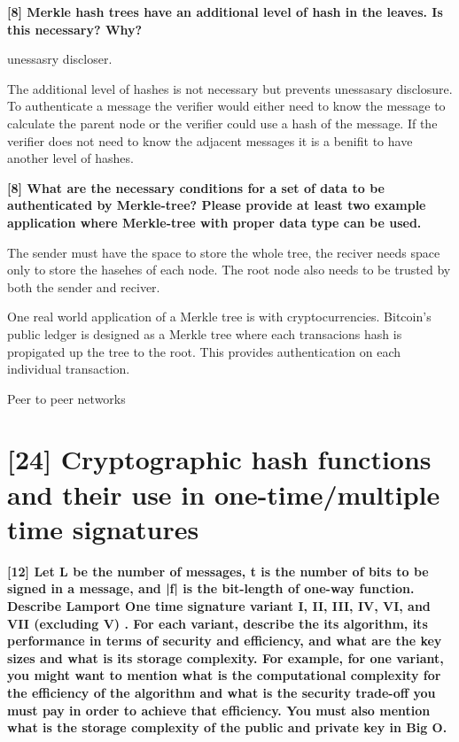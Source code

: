 \documentclass[letterpaper,11pt,notitlepage,fleqn]{article}
\begin{document}
\noindent \textbf{[8] Merkle hash trees have an additional level of hash in the leaves. Is this necessary? Why?}

unessasry discloser.

The additional level of hashes is not necessary but prevents unessasary disclosure. To authenticate a message the verifier would either need to know the message to calculate the parent node or the verifier could use a hash of the message. If the verifier does not need to know the adjacent messages it is a benifit to have another level of hashes. 

\noindent \textbf{[8] What are the necessary conditions for a set of data to be authenticated by Merkle-tree? Please provide at least two example application where Merkle-tree with proper data type can be used.}

The sender must have the space to store the whole tree, the reciver needs space only to store the hasehes of each node. The root node also needs to be trusted by both the sender and reciver. 

One real world application of a Merkle tree is with cryptocurrencies. Bitcoin's public ledger is designed as a Merkle tree where each transacions hash is propigated up the tree to the root. This provides authentication on each individual transaction.

Peer to peer networks


\section{[24] Cryptographic hash functions and their use in one-time/multiple time signatures}

\noindent \textbf{[12] Let L be the number of messages, t is the number of bits to be signed in a message, and |f| is the bit-length of one-way function. Describe Lamport One time signature variant I, II, III, IV, VI, and VII (excluding V) . For each variant, describe the its algorithm, its performance in terms of security and efficiency,  and what are the key sizes and what is its storage complexity. For example, for one variant, you might want to mention what is the computational complexity for the
efficiency  of the algorithm and what is the security trade-off you must pay in order to achieve that efficiency. You must also mention what is the storage complexity of the public and private key in Big O.} 
\end{document}
